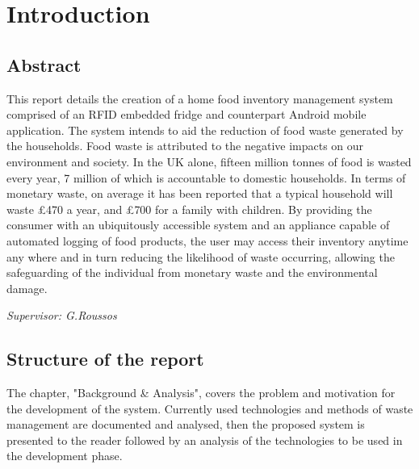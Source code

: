 \documentclass[a4paper, 11pt]{article}
\begin{document}
\clearpage




\pagestyle{fancy}
\renewcommand{\sectionmark}[1]{\markboth{#1}{}}
\fancyhf{} %
\renewcommand{\headrulewidth}{0pt}
\setlength{\footskip}{80pt}
\lhead{}
\chead{}
\cfoot{\fancyplain{}{\leftmark }} 

\setcounter{page}{1}
\section{Introduction}

\subsection{Abstract}
This report details the creation of a home food inventory management system comprised of an RFID embedded fridge and counterpart Android mobile application. The system intends to aid the reduction of food waste generated by the households. Food waste is attributed to the negative impacts on our environment and society. In the UK alone, fifteen million tonnes of food is wasted every year, 7 million of which is accountable to domestic households.\cite{statistic} In terms of monetary waste, on average it has been reported that a typical household will waste \pounds{470} a year, and \pounds{700} for a family with children.\cite{WRAP} By providing the consumer with an ubiquitously accessible system and an appliance capable of automated logging of food products, the user may access their inventory anytime any where and in turn reducing the likelihood of waste occurring, allowing the safeguarding of the individual from monetary waste and the environmental damage.
\vspace{\baselineskip}

\noindent\emph{Supervisor: G.Roussos}

\vspace{\baselineskip}

\subsection{Structure of the report}
The chapter, "Background \& Analysis", covers the problem and motivation for the development of the system. Currently used technologies and methods of waste management are documented and analysed, then the proposed system is presented to the reader followed by an analysis of the technologies to be used in the development phase.
\end{document}
